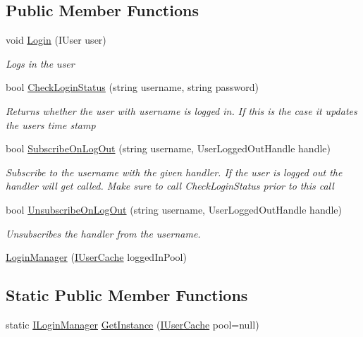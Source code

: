 \subsection*{Public Member Functions}
\begin{DoxyCompactItemize}
\item 
void \mbox{\hyperlink{class_application_1_1_managers_1_1_login_manager_a561516fbf8f97f695efdb1cb696899e8}{Login}} (I\+User user)
\begin{DoxyCompactList}\small\item\em Logs in the user \end{DoxyCompactList}\item 
bool \mbox{\hyperlink{class_application_1_1_managers_1_1_login_manager_ab485bd570a5d994461c54eb07e97a43a}{Check\+Login\+Status}} (string username, string password)
\begin{DoxyCompactList}\small\item\em Returns whether the user with username is logged in. If this is the case it updates the users time stamp \end{DoxyCompactList}\item 
bool \mbox{\hyperlink{class_application_1_1_managers_1_1_login_manager_a9502ab9e9e8d04a42a9c3cdf451b405b}{Subscribe\+On\+Log\+Out}} (string username, User\+Logged\+Out\+Handle handle)
\begin{DoxyCompactList}\small\item\em Subscribe to the username with the given handler. If the user is logged out the handler will get called. Make sure to call Check\+Login\+Status prior to this call \end{DoxyCompactList}\item 
bool \mbox{\hyperlink{class_application_1_1_managers_1_1_login_manager_a4490bbdc301ad6eab762fd1a567fd970}{Unsubscribe\+On\+Log\+Out}} (string username, User\+Logged\+Out\+Handle handle)
\begin{DoxyCompactList}\small\item\em Unsubscribes the handler from the username. \end{DoxyCompactList}\item 
\mbox{\hyperlink{class_application_1_1_managers_1_1_login_manager_a22b0fe0bd49da0a911f1cf39a5658d2b}{Login\+Manager}} (\mbox{\hyperlink{interface_application_1_1_interfaces_1_1_i_user_cache}{I\+User\+Cache}} logged\+In\+Pool)
\end{DoxyCompactItemize}
\subsection*{Static Public Member Functions}
\begin{DoxyCompactItemize}
\item 
static \mbox{\hyperlink{interface_application_1_1_interfaces_1_1_i_login_manager}{I\+Login\+Manager}} \mbox{\hyperlink{class_application_1_1_managers_1_1_login_manager_ad9e40fd5ba6a176474a914bb94142ee7}{Get\+Instance}} (\mbox{\hyperlink{interface_application_1_1_interfaces_1_1_i_user_cache}{I\+User\+Cache}} pool=null)
\end{DoxyCompactItemize}


